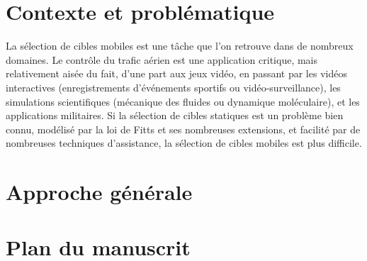 



\section*{Contexte et problématique}
    La sélection de cibles mobiles est une tâche que l'on retrouve dans de nombreux domaines. Le contrôle du trafic aérien est une application critique, mais relativement aisée du fait, d'une part aux jeux vidéo, en passant par les vidéos interactives (enregistrements d'événements sportifs ou vidéo-surveillance), les simulations scientifiques (mécanique des fluides ou dynamique moléculaire), et les applications militaires. Si la sélection de cibles statiques est un problème bien connu, modélisé par la loi de Fitts et ses nombreuses extensions, et facilité par de nombreuses techniques d'assistance, la sélection de cibles mobiles est plus difficile.
    



 
\section*{Approche générale}


\section*{Plan du manuscrit}
